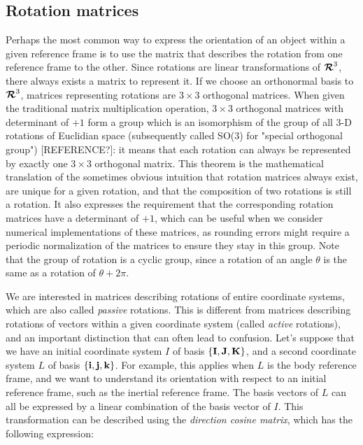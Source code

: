 \subsection{Rotation matrices}
\label{subsec:rotationMatrices}
Perhaps the most common way to express the orientation of an object within a given reference frame is to use the matrix that describes the rotation from one reference frame to the other. Since rotations are linear transformations of $\boldsymbol{\mathcal{R}}^3$, there always exists a matrix to represent it. If we choose an orthonormal basis to $\boldsymbol{\mathcal{R}}^3$, matrices representing rotations are $3\times 3$ orthogonal matrices. When given the traditional matrix multiplication operation, $3\times 3$ orthogonal matrices with determinant of $+1$ form a group which is an isomorphism of the group of all 3-D rotations of Euclidian space (subsequently called SO(3) for "special orthogonal group") [REFERENCE?]: it means that each rotation can always be represented by exactly one $3\times 3$ orthogonal matrix. This theorem is the mathematical translation of the sometimes obvious intuition that rotation matrices always exist, are unique for a given rotation, and that the composition of two rotations is still a rotation. It also expresses the requirement that the corresponding rotation matrices have a determinant of $+1$, which can be useful when we consider numerical implementations of these matrices, as rounding errors might require a periodic normalization of the matrices to ensure they stay in this group. Note that the group of rotation is a cyclic group, since a rotation of an angle $\theta$ is the same as a rotation of $\theta+2\pi$.

We are interested in matrices describing rotations of entire coordinate systems, which are also called \textit{passive} rotations. This is different from matrices describing rotations of vectors within a given coordinate system (called \textit{active} rotations), and an important distinction that can often lead to confusion. Let's suppose that we have an initial coordinate system $I$ of basis $\{\textrm{\textbf{I}},\textrm{\textbf{J}},\textrm{\textbf{K}}\}$, and a second coordinate system $L$ of basis $\{\textrm{\textbf{i}},\textrm{\textbf{j}},\textrm{\textbf{k}}\}$. For example, this applies when $L$ is the body reference frame, and we want to understand its orientation with respect to an initial reference frame, such as the inertial reference frame. The basis vectors of $L$ can all be expressed by a linear combination of the basis vector of $I$. This transformation can be described using the \textit{direction cosine matrix}, which has the following expression:


